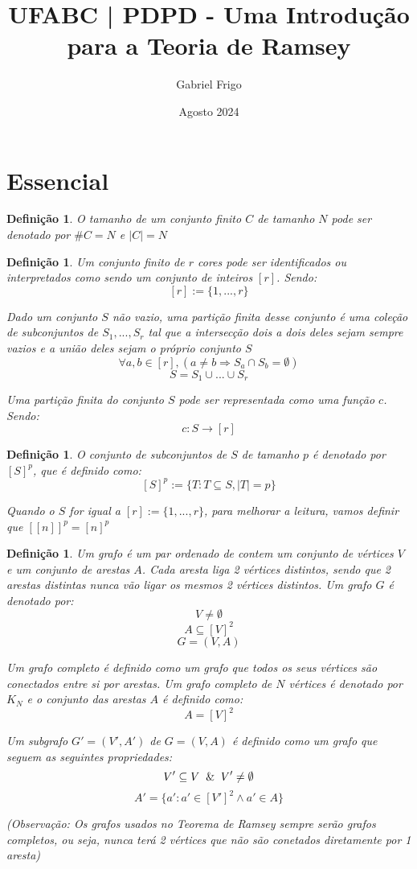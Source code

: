 \documentclass{article}
\title{UFABC | PDPD - Uma Introdução para a Teoria de Ramsey}
\author{Gabriel Frigo}
\date{Agosto 2024}
\newtheorem{defi}[teor]{Definição}
\begin{document}
\maketitle


\section{Essencial}


\begin{defi}
  \label{size_of_set}
  O \emph{tamanho de um conjunto finito} $C$ de tamanho $N$ pode ser denotado por $\#C = N$ e $\mid C \mid = N$
\end{defi}

\begin{defi}
    \label{finite_partition_c}
    Um \emph{conjunto finito de $r$ cores} pode ser identificados ou interpretados como sendo um conjunto de inteiros $[r]$. Sendo:
    \[[r]:=\{1, ..., r\}\]

    Dado um conjunto $S$ não vazio, uma partição finita desse conjunto é uma coleção de subconjuntos de $S_1, ..., S_r$ tal que a intersecção dois a dois deles sejam sempre vazios e a união deles sejam o próprio conjunto $S$
    \[\forall{a,b} \in [r], (a \neq b \Rightarrow S_a \cap S_b = \emptyset)\]
    \[S = S_1 \cup ... \cup S_r \]

    Uma \emph{partição finita do conjunto $S$} pode ser representada como uma função $c$. Sendo:
    \[c:S\rightarrow[r]\]
\end{defi}

\begin{defi}
    \label{subset_p}
    O \emph{conjunto de subconjuntos de $S$ de tamanho $p$} é denotado por $[S]^p$, que é definido como:
    \[[S]^p:=\{T: T \subseteq S, |T| = p\}\]

    Quando o $S$ for igual a $[r]:=\{1, ..., r\}$, para melhorar a leitura, vamos definir que $[[n]]^p = [n]^p$
\end{defi}

\begin{defi}
    \label{graph_g}
    Um \emph{grafo} é um par ordenado de contem um conjunto de vértices $V$ e um conjunto de arestas $A$. Cada aresta liga 2 vértices distintos, sendo que 2 arestas distintas nunca vão ligar os mesmos 2 vértices distintos. Um grafo $G$ é denotado por:
    \[V \neq \emptyset\]
    \[A \subseteq [V]^2\]
    \[G = (V, A)\]

    Um \emph{grafo completo} é definido como um grafo que todos os seus vértices são conectados entre si por arestas. Um grafo completo de $N$ vértices é denotado por $K_N$ e o conjunto das arestas $A$ é definido como:
    \[A = [V]^2\]

    Um \emph{subgrafo} $G' = (V', A')$ de $G = (V, A)$ é definido como um grafo que seguem as seguintes propriedades:
    \[V' \subseteq V \And V' \neq \emptyset\]
    \[A' = \{a': a' \in [V']^2 \wedge a' \in A\}\]

    (Observação: Os grafos usados no Teorema de Ramsey sempre serão grafos completos, ou seja, nunca terá 2 vértices que não são conetados diretamente por 1 aresta)
\end{defi}
\end{document}
